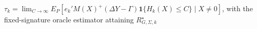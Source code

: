 \(\tau_k=\lim_{C\to\infty}E_P[e_k'M(X)^+(\Delta Y-\Gamma)\mathbf 1\{H_k(X)\le C\}\mid X\ne0]\), with the fixed-signature oracle estimator attaining \(R_{G,\Sigma,k}^{\star}\)